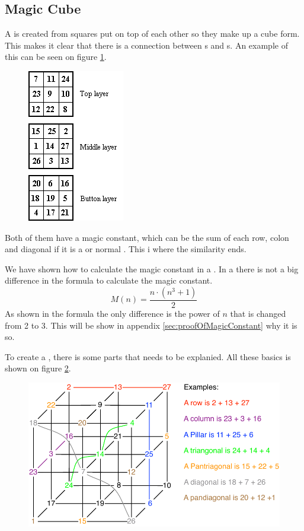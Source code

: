 \subsection{Magic Cube}
A \mcube{} is created from squares put on top of each other so they make up a cube form. 
This makes it clear that there is a connection between \msquare{}s and  \mcube{}s.
An example of this can be seen on figure \ref{fig:presentMagicCube}.

\begin{figure}[h]
	\centering
		\includegraphics[scale=0.8]{input/pics/presentMagicCube}
	\caption{}
	\label{fig:presentMagicCube}
\end{figure}

Both of them have a magic constant, which can be the sum of each row, colon and diagonal if it is a  \mcube{} or normal \msquare{}.
This i where the similarity ends.

We have shown how to calculate the magic constant in a \msquare{}.
In a  \mcube{} there is not a big difference in the formula to calculate the magic constant.
\begin{equation}
	M(n)=\frac{n \cdot (n^3+1)}{2}
\end{equation}
As shown in the formula the only difference is the power of $n$ that is changed from 2 to 3.
This will be show in appendix \ref{sec:proofOfMagicConstant} why it is so.

To create a  \mcube{}, there is some parts that needs to be explanied.
All these basics is shown on figure \ref{fig:cubeparts}.

\begin{figure}[h]
	\centering
		\includegraphics[scale=0.4]{input/pics/cubeparts}
	\caption{}
	\label{fig:cubeparts}
\end{figure}

